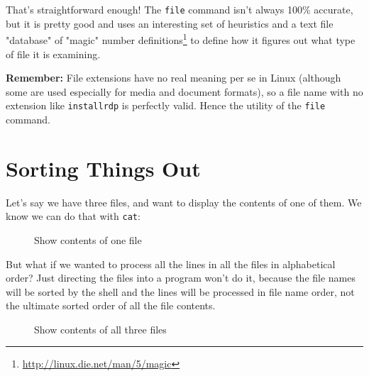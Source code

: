 \documentclass[10pt,american,]{book}
\makeatletter
\newenvironment{Shaded}{\begin{snugshade}}{\end{snugshade}}
\newcommand{\KeywordTok}[1]{\textcolor[rgb]{0.13,0.29,0.53}{\textbf{{#1}}}}
\newcommand{\NormalTok}[1]{{#1}}
\renewcommand{\href}[2]{#2\footnote{\url{#1}}}
\numberwithin{figure}{chapter}
\DeclareRobustCommand{\drcap}[1]{\begin{figure}[H]\caption{#1}\end{figure}}
\DeclareRobustCommand{\drcmd}[1]{\index{commands!#1@\texttt{#1}}}
\renewcommand{\KeywordTok}[1]{{#1}}
\renewcommand{\NormalTok}[1]{{#1}}
\makeatother
\begin{document}
That's straightforward enough! The \texttt{file} command isn't always
100\% accurate, but it is pretty good and uses an interesting set of
heuristics and a text file "database" of
\href{http://linux.die.net/man/5/magic}{"magic" number definitions} to
define how it figures out what type of file it is examining.

\textbf{Remember:} File extensions have no real meaning per se in Linux
(although some are used especially for media and document formats), so a
file name with no extension like \texttt{installrdp} is perfectly valid.
Hence the utility of the \texttt{file} command.

\section*{Sorting Things Out}\label{sorting-things-out}

Let's say we have three files, and want to display the contents of one
of them. We know we can do that with \texttt{cat}\drcmd{cat}:

\drcap{Show contents of one file}

\begin{Shaded}
\end{Shaded}

But what if we wanted to process all the lines in all the files in
alphabetical order? Just directing the files into a program won't do it,
because the file names will be sorted by the shell and the lines will be
processed in file name order, not the ultimate sorted order of all the
file contents.

\drcap{Show contents of all three files}

\begin{Shaded}
\end{Shaded}
\end{document}
